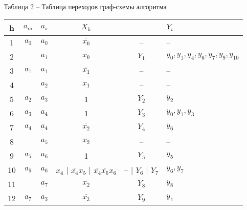 \begin{table*}[ht]
  Таблица 2 – Таблица переходов граф-схемы алгоритма\par
  \renewcommand{\arraystretch}{1.2}
  \begin{tabularx}{\textwidth}{|c|c|c|c|c|>{\centering\arraybackslash}X|}
    \hline
    h  & $a_m$    & $a_s$    & $X_h$               &                                           & \(Y_t\)                                \\ \hline
    1  & $a_0$    & $a_0$    & $\overline{x_0}$    &  –                                        & –                                      \\ \hline
    2  &          & $a_1$    & $x_0$               & $Y_1$                                     & $y_0, y_1, y_4, y_6, y_7, y_9, y_{10}$ \\ \hline
    3  & $a_1$    & $a_1$    & $\overline{x_1}$    &  –                                        &  –                                     \\ \hline
    4  &          & $a_2$    & $x_1$               &  –                                        &  –                                     \\ \hline
    5  & $a_2$    & $a_3$    &  1                  & $Y_2$                                     & $y_2$                                  \\ \hline
    6  & $a_3$    & $a_4$    &  1                  & $Y_3$                                     & $y_0, y_1, y_3$                        \\ \hline
    7  & $a_4$    & $a_4$    & $\overline{x_2}$    & $Y_4$                                     & $y_6$                                  \\ \hline
    8  &          & $a_5$    & $x_2$               &  –                                        &  –                                     \\ \hline
    9  & $a_5$    & $a_6$    &  1                  & $Y_5$                                     & $y_5$                                  \\ \hline
    10 & $a_6$    & $a_6$    & $x_4$ | $\overline{x_4}x_5$ | $\overline{x_4}\overline{x_5}x_6$ & – | $Y_6$ | $Y_7$  & $y_6, y_7$        \\ \hline
    11 &          & $a_7$    & ${x_2}$             & $Y_8$                                     & $y_8$                                  \\ \hline
    12 & $a_7$    & $a_3$    & $\overline{x_3}$    & $Y_9$                                     & $y_4$                                  \\ \hline

\end{tabularx}
\end{table*}
